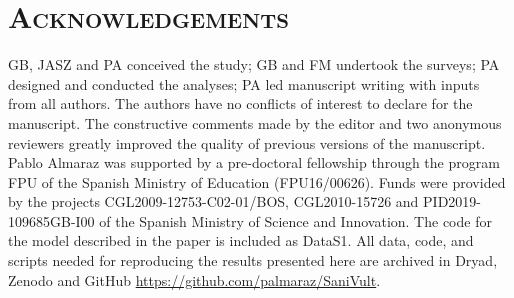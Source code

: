 \documentclass[12pt]{article}
\begin{document}
\section*{\textsc{Acknowledgements}}
GB, JASZ and PA conceived the study; GB and FM undertook the surveys; PA designed and conducted the analyses; PA led manuscript writing with inputs from all authors. The authors have no conflicts of interest to declare for the manuscript. The constructive comments made by the editor and two anonymous reviewers greatly improved the quality of previous versions of the manuscript. Pablo Almaraz was supported by a pre-doctoral fellowship through the program FPU of the Spanish Ministry of Education (FPU16/00626). Funds were provided by the projects CGL2009-12753-C02-01/BOS, CGL2010-15726 and PID2019-109685GB-I00 of the Spanish Ministry of Science and Innovation. The code for the model described in the paper is included as DataS1. All data, code, and scripts needed for reproducing the results presented here are archived in Dryad, Zenodo  and GitHub \url{https://github.com/palmaraz/SaniVult}.

%
\end{document}
